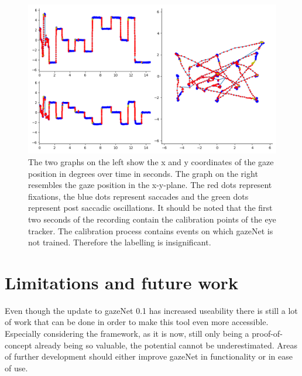 \documentclass[acmlarge]{acmart}
\begin{document}
\begin{figure}
    \caption{The two graphs on the left show the x and y coordinates of the gaze position in degrees over time in seconds. The graph on the right resembles the gaze position in the x-y-plane. The red dots represent fixations, the blue dots represent saccades and the green dots represent post saccadic oscillations. It should be noted that the first two seconds of the recording contain the calibration points of the eye tracker. The calibration process contains events on which gazeNet is not trained. Therefore the labelling is insignificant.}
    \label{fig:kreuze}
    \includegraphics[width=\linewidth]
    {Kreuze_Random Recording1_short}
\end{figure}


\section{Limitations and future work}
Even though the update to gazeNet 0.1 has increased useability there is still a lot of work that can be done in order to make this tool even more accessible. Especially considering the framework, as it is now, still only being a proof-of-concept already being so valuable, the potential cannot be underestimated. Areas of further development should either improve gazeNet in functionality or in ease of use.
\end{document}
